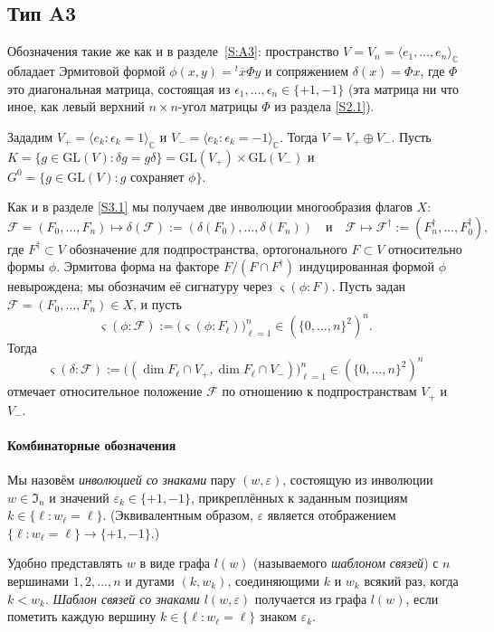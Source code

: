 \documentclass{amsart}
\theoremstyle{definition}
\begin{document}
\subsection{Тип A3}
\label{S3.2}
Обозначения такие же как и в разделе~\ref{S:A3}: пространство $V=V_n=\langle e_1,\ldots,e_n\rangle_\mathbb{C}$ обладает Эрмитовой формой $\phi(x,y)={}^t\overline{x}\Phi y$ и сопряжением $\delta(x)=\Phi x$, где $\Phi$ это диагональная матрица, состоящая из $\epsilon_1,\ldots,\epsilon_n\in\{+1,-1\}$ (эта матрица ни что иное, как левый верхний $n\times n$-угол  матрицы $\Phi$ из раздела \ref{S2.1}).

Зададим $V_+=\langle e_k:\epsilon_k=1\rangle_\mathbb{C}$ и $V_-=\langle e_k:\epsilon_k=-1\rangle_\mathbb{C}$.  Тогда $V=V_+\oplus V_-$.
Пусть $K=\{g\in\mathrm{GL}(V):\delta g=g\delta\}=\mathrm{GL}(V_+)\times\mathrm{GL}(V_-)$ и $G^0=\{g\in \mathrm{GL}(V):\mbox{$g$ сохраняет $\phi$}\}$.

Как и в разделе \ref{S3.1} мы получаем две инволюции многообразия флагов $X$:
\[\mathcal{F}=(F_0,\ldots,F_n)\mapsto\delta(\mathcal{F}):=(\delta(F_0),\ldots,\delta(F_n))\quad\mbox{и}\quad\mathcal{F}\mapsto\mathcal{F}^\dag:=(F_n^\dag,\ldots,F_0^\dag),\]
где $F^\dag\subset V$ обозначение для подпространства, ортогонального  $F\subset V$ относительно формы $\phi$.
Эрмитова форма на факторе $F/(F\cap F^\dag)$ индуцированная формой $\phi$ невырождена; мы обозначим её сигнатуру через $\varsigma(\phi:F)$. Пусть задан $\mathcal{F}=(F_0,\ldots,F_n)\in X$, и пусть
\[\varsigma(\phi:\mathcal{F}):=\big(\varsigma(\phi:F_\ell)\big)_{\ell=1}^n\in(\{0,\ldots,n\}^2)^n.\]
Тогда
\[\varsigma(\delta:\mathcal{F}):=\big((\dim F_\ell\cap V_+,\dim F_\ell\cap V_-)\big)_{\ell=1}^n\in(\{0,\ldots,n\}^2)^n\]
отмечает относительное положение $\mathcal{F}$ по отношению к подпространствам
$V_+$ и
$V_-$.

\medskip

\paragraph{\bf Комбинаторные обозначения}
Мы назовём {\em инволюцией со знаками} пару $(w,\varepsilon)$, состоящую из инволюции $w\in\mathfrak{I}_n$ и значений
$\varepsilon_k\in\{+1,-1\}$, прикреплённых к заданным позициям
$k\in\{\ell:w_\ell=\ell\}$.
(Эквивалентным образом, $\varepsilon$ является отображением $\{\ell:w_\ell=\ell\}\to\{+1,-1\}$.)

Удобно представлять $w$ в виде графа $l(w)$ (называемого {\em шаблоном связей}) с $n$ вершинами
$1,2,\ldots,n$ и дугами $(k,w_k)$, соединяющими $k$ и $w_k$ всякий раз, когда $k<w_k$.
 {\em Шаблон связей со знаками $l(w,\varepsilon)$} получается из графа $l(w)$, если пометить каждую вершину
$k\in\{\ell:w_\ell=\ell\}$ знаком $\varepsilon_k$.
\end{document}
